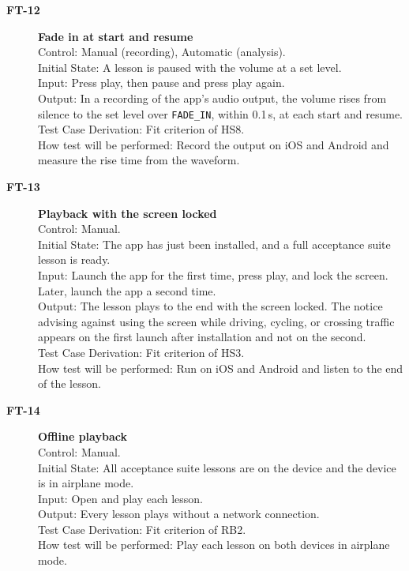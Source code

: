 \documentclass[12pt, titlepage]{article}
\newcommand{\tid}[1]{\hypertarget{test:#1}{\textbf{#1}}}
\newcommand{\cn}[1]{\texttt{#1}}
\begin{document}
\begin{description}
\item[\tid{FT-12}] \textbf{Fade in at start and resume}\\
Control: Manual (recording), Automatic (analysis).\\
Initial State: A lesson is paused with the volume at a set level.\\
Input: Press play, then pause and press play again.\\
Output: In a recording of the app's audio output, the volume rises from silence
to the set level over \cn{FADE\_IN}, within 0.1\,s, at each start and resume.\\
Test Case Derivation: Fit criterion of HS8.\\
How test will be performed: Record the output on iOS and Android and measure the
rise time from the waveform.

\item[\tid{FT-13}] \textbf{Playback with the screen locked}\\
Control: Manual.\\
Initial State: The app has just been installed, and a full acceptance suite
lesson is ready.\\
Input: Launch the app for the first time, press play, and lock the screen. Later,
launch the app a second time.\\
Output: The lesson plays to the end with the screen locked. The notice advising
against using the screen while driving, cycling, or crossing traffic appears on
the first launch after installation and not on the second.\\
Test Case Derivation: Fit criterion of HS3.\\
How test will be performed: Run on iOS and Android and listen to the end of the
lesson.

\item[\tid{FT-14}] \textbf{Offline playback}\\
Control: Manual.\\
Initial State: All acceptance suite lessons are on the device and the device is
in airplane mode.\\
Input: Open and play each lesson.\\
Output: Every lesson plays without a network connection.\\
Test Case Derivation: Fit criterion of RB2.\\
How test will be performed: Play each lesson on both devices in airplane mode.

\end{description}
\end{document}
